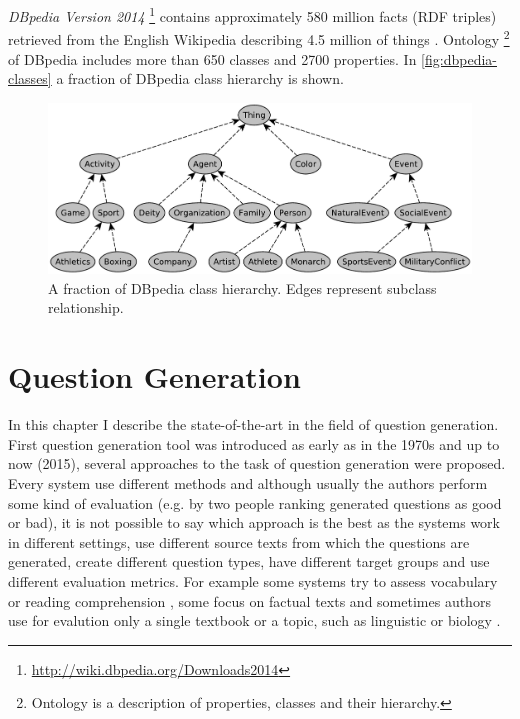 \documentclass[a4paper, 12pt, twoside]{fithesis2}		%
\renewcommand{\_}{\leavevmode \kern0.07em\vbox{\hrule width0.4em}}
\begin{document}
\emph{DBpedia Version 2014}%
\footnote{\url{http://wiki.dbpedia.org/Downloads2014}}
contains approximately 580 million facts (RDF triples) retrieved from the English Wikipedia
describing 4.5 million of things \parencite{dbpedia}.
Ontology%
\footnote{Ontology is a description of properties, classes and their hierarchy.}
of DBpedia includes more than 650 classes and 2700 properties.
In \autoref{fig:dbpedia-classes} a fraction of DBpedia class hierarchy is shown.
\begin{figure}[h]
  \centering
  \includegraphics[width=\textwidth]{images/dbpedia-classes.pdf}
  \caption{A fraction of DBpedia class hierarchy. Edges represent subclass relationship.}
  \label{fig:dbpedia-classes}
\end{figure}


\chapter{Question Generation}
\label{chap:exercises}

In this chapter I describe the state-of-the-art in the field of question generation.
First question generation tool was introduced as early as in the 1970s \cite{questions-wolfe}
and up to now (2015), several approaches to the task of question generation were proposed.
Every system use different methods and although usually the authors perform some kind of evaluation (e.g. by two people ranking generated questions as good or bad), it is not possible to say which approach is the best as the systems work in different settings, use different source texts from which the questions are generated, create different question types, have different target groups and use different evaluation metrics.
For example some systems try to assess vocabulary \cite{question-gen-vocabulary}
or reading comprehension \cite{question-overgenerating-rating},
some focus on factual texts \cite{question-gen-heilman}
and sometimes authors use for evalution only a single textbook or a topic, such as linguistic \cite{question-gen-mitkov} or biology \cite{question-gen-textbooks}.
\end{document}
